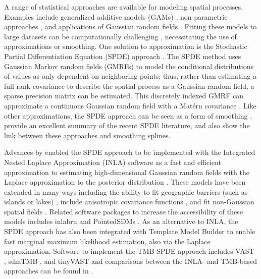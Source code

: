 \documentclass[11pt]{article}
\begin{document}
A range of statistical approaches are available for modeling spatial processes.
Examples include generalized additive models (GAMs)
\citep{murase_application_2009, forney_habitat-based_2012,mgcv}, non-parametric
approaches \citep{mutanga_high_2012}, and applications of Gaussian random
fields \citep{latimer_hierarchical_2009,datta_hierarchical_2016}. Fitting these
models to large datasets can be computationally challenging
\citep{banerjee_hierarchical_2004}, necessitating the use of approximations or
smoothing. One solution to approximation is the Stochastic Partial
Differentiation Equation (SPDE) approach \citep{lindgren_explicit_2011}. The
SPDE method uses Gaussian Markov random fields (GMRFs) to model the conditional
distributions of values as only dependent on neighboring points; thus, rather
than estimating a full rank covariance to describe the spatial process as a
Gaussian random field, a sparse precision matrix can be estimated. This
discretely indexed GMRF can approximate a continuous Gaussian random field with
a Matérn covariance \citep{lindgren_explicit_2011}. Like other approximations,
the SPDE approach can be seen as a form of smoothing
\citep{yue2014,miller2020}. \citet{miller2020} provide an excellent summary of
the recent SPDE literature, and also show the link between these approaches and
smoothing splines.

Advances by \citet{rue_approximate_2009} enabled the SPDE approach to be
implemented with the Integrated Nested Laplace Approximation (INLA) software as
a fast and efficient approximation to estimating high-dimensional Gaussian
random fields with the Laplace approximation to the posterior distribution
\citep{lindgren_bayesian_2015}. These models have been extended in many ways
\citep{bakka_spatial_2018} including the ability to fit geographic barriers
(such as islands or lakes) \citep{bakka2019}, include anisotropic covariance
functions \citep{haskard2007}, and fit non-Gaussian spatial fields
\citep{wallinGeostatisticalModelling2015}. Related software packages to
increase the accessibility of these models includes inlabru \citep{bachl2019}
and PointedSDMs \citep{mostert2023}. As an alternative to INLA, the SPDE
approach has also been integrated with Template Model Builder
\citep[TMB,][]{kristensen_tmb_2016} to enable fast marginal maximum likelihood
estimation, also via the Laplace approximation. Software to implement the
TMB-SPDE approach includes VAST \citep{thorson2019}, sdmTMB
\citep{anderson2022}, and tinyVAST \citep{tinyVAST} and comparisons between the
INLA- and TMB-based approaches can be found in \citet{osgood-zimmerman2022}.
\end{document}

